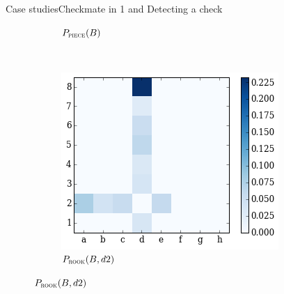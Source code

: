 \documentclass[9pt, unknownkeysallowed]{beamer}
\begin{document}
\begin{frame}{Case studies}{Checkmate in 1 and Detecting a check}
\begin{figure}[H]
\begin{subfigure}[t]{0.3\textwidth}
        \caption{$P_{\textsc{piece}}(B)$}
    \end{subfigure}
    ~
    \begin{subfigure}[t]{0.3\textwidth}
        \centering
        \includegraphics[width=\textwidth]{../img/best_moves/output_21_6.png}
        \caption{$P_{\textsc{rook}}(B, d2)$}
    \end{subfigure}
\label{figure:checkmating}
\end{figure}


\end{frame}
\end{document}
